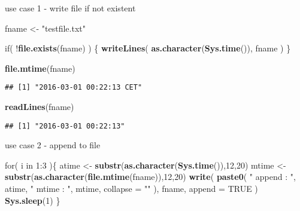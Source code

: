 \documentclass[ignorenonframetext,]{beamer}
\newenvironment{Shaded}{\begin{snugshade}}{\end{snugshade}}
\newcommand{\KeywordTok}[1]{\textcolor[rgb]{0.13,0.29,0.53}{\textbf{{#1}}}}
\newcommand{\DataTypeTok}[1]{\textcolor[rgb]{0.13,0.29,0.53}{{#1}}}
\newcommand{\DecValTok}[1]{\textcolor[rgb]{0.00,0.00,0.81}{{#1}}}
\newcommand{\StringTok}[1]{\textcolor[rgb]{0.31,0.60,0.02}{{#1}}}
\newcommand{\OtherTok}[1]{\textcolor[rgb]{0.56,0.35,0.01}{{#1}}}
\newcommand{\NormalTok}[1]{{#1}}
\begin{document}
\begin{frame}[fragile]{use case 1 - write file if not existent}

\begin{Shaded}
\begin{Highlighting}[]
\NormalTok{fname <-}\StringTok{ "testfile.txt"}

\NormalTok{if( !}\KeywordTok{file.exists}\NormalTok{(fname)  ) \{}
  \KeywordTok{writeLines}\NormalTok{( }\KeywordTok{as.character}\NormalTok{(}\KeywordTok{Sys.time}\NormalTok{()), fname )}
\NormalTok{\}}

\KeywordTok{file.mtime}\NormalTok{(fname)}
\end{Highlighting}
\end{Shaded}

\begin{verbatim}
## [1] "2016-03-01 00:22:13 CET"
\end{verbatim}

\begin{Shaded}
\begin{Highlighting}[]
\KeywordTok{readLines}\NormalTok{(fname)}
\end{Highlighting}
\end{Shaded}

\begin{verbatim}
## [1] "2016-03-01 00:22:13"
\end{verbatim}

\end{frame}

\begin{frame}[fragile]{use case 2 - append to file}

\begin{Shaded}
\begin{Highlighting}[]
\NormalTok{for( i in }\DecValTok{1}\NormalTok{:}\DecValTok{3} \NormalTok{)\{}
  \NormalTok{atime <-}\StringTok{ }\KeywordTok{substr}\NormalTok{(}\KeywordTok{as.character}\NormalTok{(}\KeywordTok{Sys.time}\NormalTok{()),}\DecValTok{12}\NormalTok{,}\DecValTok{20}\NormalTok{)}
  \NormalTok{mtime <-}\StringTok{ }\KeywordTok{substr}\NormalTok{(}\KeywordTok{as.character}\NormalTok{(}\KeywordTok{file.mtime}\NormalTok{(fname)),}\DecValTok{12}\NormalTok{,}\DecValTok{20}\NormalTok{)}
  \KeywordTok{write}\NormalTok{(}
    \KeywordTok{paste0}\NormalTok{(}
      \StringTok{" append : "}\NormalTok{, atime, }\StringTok{"   mtime : "}\NormalTok{, mtime, }
      \DataTypeTok{collapse =} \StringTok{""}
    \NormalTok{), }
    \NormalTok{fname, }
    \DataTypeTok{append =} \OtherTok{TRUE}
  \NormalTok{)}
  \KeywordTok{Sys.sleep}\NormalTok{(}\DecValTok{1}\NormalTok{)}
\NormalTok{\}}
\end{Highlighting}
\end{Shaded}

\end{frame}
\end{document}
